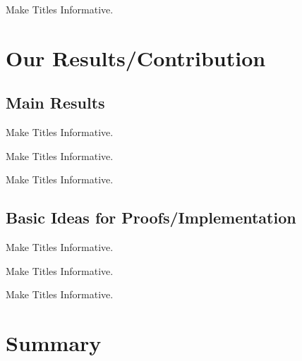 \documentclass{beamer}
\begin{document}
\begin{frame}{Make Titles Informative.}
\end{frame}



\section{Our Results/Contribution}

\subsection{Main Results}

\begin{frame}{Make Titles Informative.}
\end{frame}

\begin{frame}{Make Titles Informative.}
\end{frame}

\begin{frame}{Make Titles Informative.}
\end{frame}


\subsection{Basic Ideas for Proofs/Implementation}

\begin{frame}{Make Titles Informative.}
\end{frame}

\begin{frame}{Make Titles Informative.}
\end{frame}

\begin{frame}{Make Titles Informative.}
\end{frame}



\section{Summary}
\end{document}
